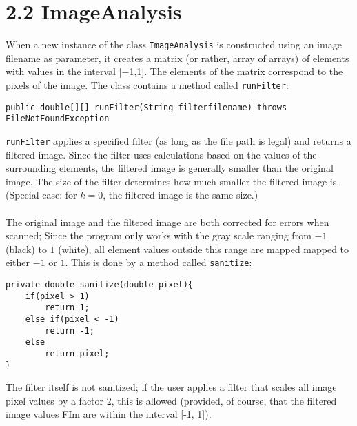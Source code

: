 \section*{2.2 ImageAnalysis}


When a new instance of the class \texttt{ImageAnalysis} is constructed using an image filename as parameter, it creates a matrix (or rather, array of arrays) of elements with values in the interval [$-$1,1]. The elements of the matrix correspond to the pixels of the image. The class contains a method called \texttt{runFilter}: 

\begin{lstlisting}
public double[][] runFilter(String filterfilename) throws FileNotFoundException
\end{lstlisting}

\texttt{runFilter} applies a specified filter (as long as the file path is legal) and returns a filtered image. Since the filter uses calculations based on the values of the surrounding elements, the filtered image is generally smaller than the original image. The size of the filter determines how much smaller the filtered image is. (Special case: for $k=0$, the filtered image is the same size.)\\
\\
The original image and the filtered image are both corrected for errors when scanned; Since the program only works with the gray scale ranging from $-1$ (black) to $1$ (white), all element values outside this range are mapped mapped to either $-1$ or $1$. This is done by a method called \texttt{sanitize}: 

\begin{lstlisting}
private double sanitize(double pixel){
	if(pixel > 1)
		return 1;
	else if(pixel < -1)
		return -1;
	else 
		return pixel;
}
\end{lstlisting}

The filter itself is not sanitized; if the user applies a filter that scales all image pixel values by a factor 2, this is allowed (provided, of course, that the filtered image values FIm are within the interval [-1, 1]).